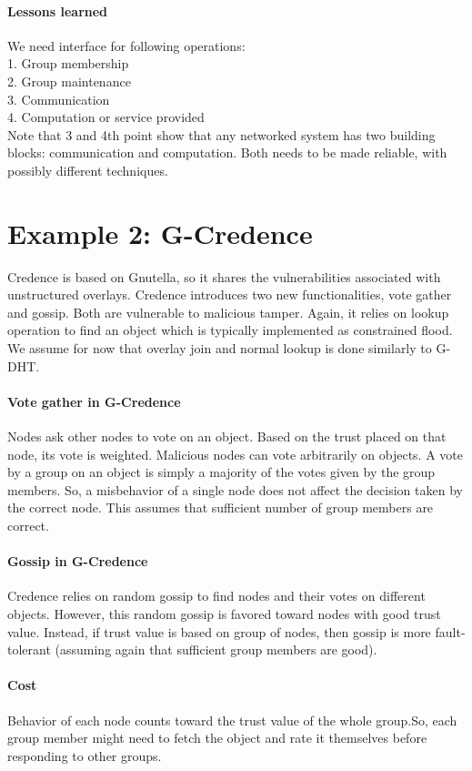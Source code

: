 \paragraph{Lessons learned}
We need interface for following operations:\\
1. Group membership \\
2. Group maintenance \\
3. Communication \\
4. Computation or service provided\\
Note that 3 and 4th point show that any networked system has two building blocks: communication and computation. Both needs to be made reliable, with possibly different techniques.

\section{Example 2: G-Credence}
Credence is based on Gnutella, so it shares the vulnerabilities associated with unstructured overlays. Credence introduces two new functionalities, vote gather and gossip. Both are vulnerable to malicious tamper. Again, it relies on lookup operation to find an object which is typically implemented as constrained flood. We assume for now that overlay join and normal lookup is done similarly to G-DHT.

\paragraph{Vote gather in G-Credence}
Nodes ask other nodes to vote on an object. Based on the trust placed on that node, its vote is weighted. Malicious nodes can vote arbitrarily on objects. A vote by a group on an object is simply a majority of the votes given by the group members. So, a misbehavior of a single node does not affect the decision taken by the correct node. This assumes that sufficient number of group members are correct.

\paragraph{Gossip in G-Credence}
Credence relies on random gossip to find nodes and their votes on different objects. However, this random gossip is favored toward nodes with good trust value. Instead, if trust value is based on group of nodes, then gossip is more fault-tolerant (assuming again that sufficient group members are good).

\paragraph{Cost} Behavior of each node counts toward the trust value of the whole group.So, each group member might need to fetch the object and rate it themselves before responding to other groups. 


